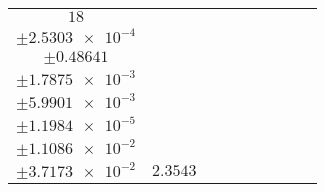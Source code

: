\documentclass[8pt]{article}
\begin{document}
\begin{longtable}[l]{c c c c c c c c c}
$\num{18}$ & \begin{tabular}[c]{@{}c@{}}$\num{2.9946e-2}$ \\ $\pm\num{2.5303e-4}$\end{tabular} & \begin{tabular}[c]{@{}c@{}}$\num{0.71407}$ \\ $\pm\num{0.48641}$\end{tabular} & \begin{tabular}[c]{@{}c@{}}$\num{8.2068}$ \\ $\pm\num{1.7875e-3}$\end{tabular} & \begin{tabular}[c]{@{}c@{}}$\num{3.6349e+3}$ \\ $\pm\num{5.9901e-3}$\end{tabular} & \begin{tabular}[c]{@{}c@{}}$\num{7.2718}$ \\ $\pm\num{1.1984e-5}$\end{tabular} & \begin{tabular}[c]{@{}c@{}}$\num{1.1535}$ \\ $\pm\num{1.1086e-2}$\end{tabular} & \begin{tabular}[c]{@{}c@{}}$\num{4.2206}$ \\ $\pm\num{3.7173e-2}$\end{tabular} & $\num{2.3543}$\\
\bottomrule
\end{longtable}
\end{document}
